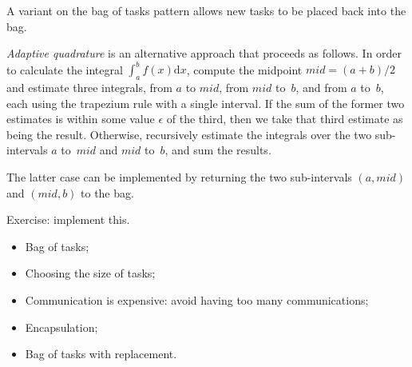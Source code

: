 \begin{slide}

A variant on the bag of tasks pattern allows new tasks to be placed back into
the bag. 

\emph{Adaptive quadrature} is an alternative approach that proceeds as
follows.  In order to calculate the integral $\int_a^b f(x) \mbox{d}x$,
compute the midpoint $mid = (a+b)/2$ and estimate three integrals, from $a$ to
$mid$, from $mid$ to~$b$, and from $a$ to~$b$, each using the trapezium rule
with a single interval.  If the sum of the former two estimates is within some
value $\epsilon$ of the third, then we take that third estimate as being the
result.  Otherwise, recursively estimate the integrals over the two
sub-intervals $a$ to~$mid$ and $mid$ to~$b$, and sum the results.

The latter case can be implemented by returning the two sub-intervals $(a,
mid)$ and $(mid, b)$ to the bag.

Exercise: implement this.
\end{slide}


\begin{slide}

\begin{itemize}






\item
Bag of tasks;

\item
Choosing the size of tasks;

\item
Communication is expensive: avoid having too many communications;

\item
Encapsulation;

\item Bag of tasks with replacement.
\end{itemize}
\end{slide}
